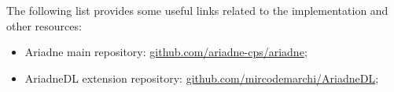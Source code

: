 The following list provides some useful links related to the implementation and other resources: 
\begin{itemize}
	\item Ariadne main repository: \href{https://github.com/ariadne-cps/ariadne}{github.com/ariadne-cps/ariadne};
	\item AriadneDL extension repository: \href{https://github.com/mircodemarchi/AriadneDL}{github.com/mircodemarchi/AriadneDL};
\end{itemize}